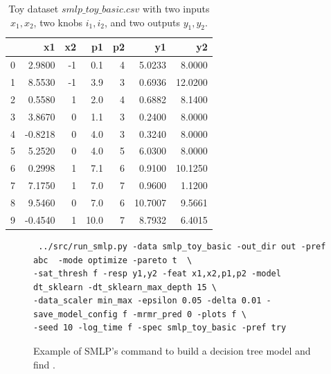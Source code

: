 \documentclass[a4paper,parskip=half]{article} %
\begin{document}
\begin{table}[t]
\centering\small
\begin{tabular}{lrrrrrr}
\hline %
{} &      x1 &  x2 &    p1 &  p2 &       y1 &       y2 \\
\hline %
0 &  2.9800 &  -1 &   0.1 &   4 &   5.0233 &   8.0000 \\
1 &  8.5530 &  -1 &   3.9 &   3 &   0.6936 &  12.0200 \\
2 &  0.5580 &   1 &   2.0 &   4 &   0.6882 &   8.1400 \\
3 &  3.8670 &   0 &   1.1 &   3 &   0.2400 &   8.0000 \\
4 & -0.8218 &   0 &   4.0 &   3 &   0.3240 &   8.0000 \\
5 &  5.2520 &   0 &   4.0 &   5 &   6.0300 &   8.0000 \\
6 &  0.2998 &   1 &   7.1 &   6 &   0.9100 &  10.1250 \\
7 &  7.1750 &   1 &   7.0 &   7 &   0.9600 &   1.1200 \\
8 &  9.5460 &   0 &   7.0 &   6 &  10.7007 &   9.5661 \\
9 & -0.4540 &   1 &  10.0 &   7 &   8.7932 &   6.4015 \\
\hline %
\end{tabular}
\caption{Toy dataset $smlp\_toy\_basic.csv$ with two inputs $x_1, x_2$, two knobs $i_1, i_2$, and two outputs $y_1, y_2$.}
\label{toy_basic_df}
\end{table}

\begin{figure}%
\begin{verbatim}
 ../src/run_smlp.py -data smlp_toy_basic -out_dir out -pref abc  -mode optimize -pareto t  \
-sat_thresh f -resp y1,y2 -feat x1,x2,p1,p2 -model dt_sklearn -dt_sklearn_max_depth 15 \
-data_scaler min_max -epsilon 0.05 -delta 0.01 -save_model_config f -mrmr_pred 0 -plots f \
-seed 10 -log_time f -spec smlp_toy_basic -pref try
\end{verbatim}
\caption{Example of SMLP's command to build a decision tree model and find .}
\label{fig:command}
\end{figure}
\end{document}
